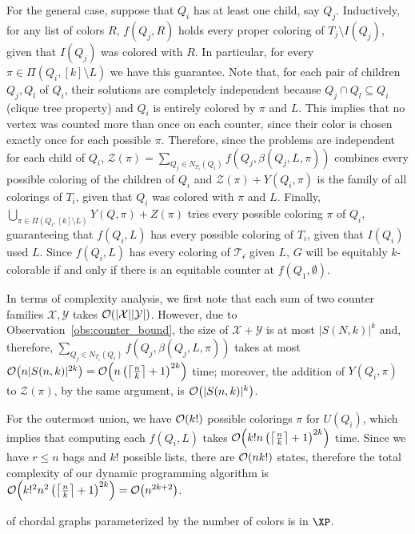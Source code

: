 \begin{tproof}
    For the general case, suppose that $Q_i$ has at least one child, say $Q_j$.
    Inductively, for any list of colors $R$, $f(Q_j, R)$ holds every proper coloring of $T_j \setminus I(Q_j)$, given that $I(Q_j)$ was colored with $R$.
    In particular, for every $\pi \in \Pi(Q_i, [k] \setminus L)$ we have this guarantee.
    Note that, for each pair of children $Q_j, Q_l$ of $Q_i$, their solutions are completely independent because $Q_j \cap Q_l \subseteq Q_i$ (clique tree property) and $Q_i$ is entirely colored by $\pi$ and $L$.
    This implies that no vertex was counted more than once on each counter, since their color is chosen exactly once for each possible $\pi$.
    Therefore, since the problems are independent for each child of $Q_i$, $\mathcal{Z}(\pi) = \sum_{Q_j \in N_{T_i}(Q_i)} f(Q_j, \beta(Q_j, L, \pi))$ combines every possible coloring of the children of $Q_i$ and $\mathcal{Z}(\pi) + Y(Q_i, \pi)$ is the family of all colorings of $T_i$, given that $Q_i$ was colored with $\pi$ and $L$.
    Finally, $\bigcup_{\pi \in \Pi(Q_i, [k] \setminus L)} Y(Q, \pi) + Z(\pi)$ tries every possible coloring $\pi$ of $Q_i$, guaranteeing that $f(Q_i, L)$ has every possible coloring of $T_i$, given that $I(Q_i)$ used $L$.
    Since $f(Q_i, L)$ has every coloring of $\mathcal{T_i}$ given $L$, $G$ will be equitably $k$-colorable if and only if there is an equitable counter at $f(Q_1, \emptyset)$.
    
    In terms of complexity analysis, we first note that each sum of two counter families $\mathcal{X},\mathcal{Y}$ takes $\mathcal{O}\!\left(|\mathcal{X}||\mathcal{Y}|\right)$.
    However, due to Observation~\ref{obs:counter_bound}, the size of $\mathcal{X} + \mathcal{Y}$ is at most $|S(N,k)|^k$ and, therefore, $\sum_{Q_j \in N_{T_i}(Q_i)} f(Q_j, \beta(Q_j, L, \pi))$ takes at most $\mathcal{O}\!\left(n|S(n,k)|^{2k}\right) = \mathcal{O}\!\left(n \left(\left\lceil\frac{n}{k}\right\rceil + 1\right)^{2k}\right)$ time; moreover, the addition of $Y(Q_i, \pi)$ to $\mathcal{Z}(\pi)$, by the same argument, is $\mathcal{O}\!\left(|S(n,k)|^k\right)$.
    
    For the outermost union, we have $\mathcal{O}\!\left(k!\right)$ possible colorings $\pi$ for $U(Q_i)$, which implies that computing each $f(Q_i, L)$ takes $\mathcal{O}\!\left(k!n\left(\left\lceil\frac{n}{k}\right\rceil + 1\right)^{2k}\right)$ time.
    Since we have $r \leq n$ bags and $k!$ possible lists, there are $\mathcal{O}\!\left(nk!\right)$ states, therefore the total complexity of our dynamic programming algorithm is $\mathcal{O}\!\left(k!^2n^2\left(\left\lceil\frac{n}{k}\right\rceil + 1\right)^{2k}\right) = \mathcal{O}\!\left(n^{2k + 2}\right)$.
\end{tproof}

\begin{corollary}
     of chordal graphs parameterized by the number of colors is in $\XP$.
\end{corollary}

